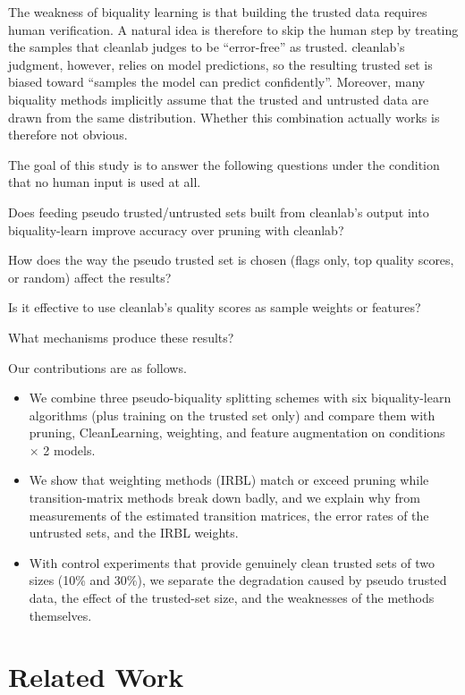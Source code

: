 \documentclass[a4paper,10pt]{article}
\newcommand{\cl}{\textsf{cleanlab}}
\newcommand{\bq}{\textsf{biquality-learn}}
\begin{document}
The weakness of biquality learning is that building the trusted data requires human verification.
A natural idea is therefore to skip the human step by treating the samples that \cl{} judges to be ``error-free'' as trusted.
\cl{}'s judgment, however, relies on model predictions, so the resulting trusted set is biased toward ``samples the model can predict confidently''.
Moreover, many biquality methods implicitly assume that the trusted and untrusted data are drawn from the same distribution.
Whether this combination actually works is therefore not obvious.

The goal of this study is to answer the following questions under the condition that no human input is used at all.
\begin{description}[leftmargin=2.5em,style=nextline]
  \item[RQ1] Does feeding pseudo trusted/untrusted sets built from \cl{}'s output into \bq{} improve accuracy over pruning with \cl{}?
  \item[RQ2] How does the way the pseudo trusted set is chosen (flags only, top quality scores, or random) affect the results?
  \item[RQ3] Is it effective to use \cl{}'s quality scores as sample weights or features?
  \item[RQ4] What mechanisms produce these results?
\end{description}

Our contributions are as follows.
\begin{itemize}
  \item We combine three pseudo-biquality splitting schemes with six \bq{} algorithms (plus training on the trusted set only) and compare them with pruning, CleanLearning, weighting, and feature augmentation on \NCond{} conditions $\times$ 2 models.
  \item We show that weighting methods (IRBL) match or exceed pruning while transition-matrix methods break down badly, and we explain why from measurements of the estimated transition matrices, the error rates of the untrusted sets, and the IRBL weights.
  \item With control experiments that provide genuinely clean trusted sets of two sizes (10\% and 30\%), we separate the degradation caused by pseudo trusted data, the effect of the trusted-set size, and the weaknesses of the methods themselves.
\end{itemize}

\section{Related Work}
\end{document}
